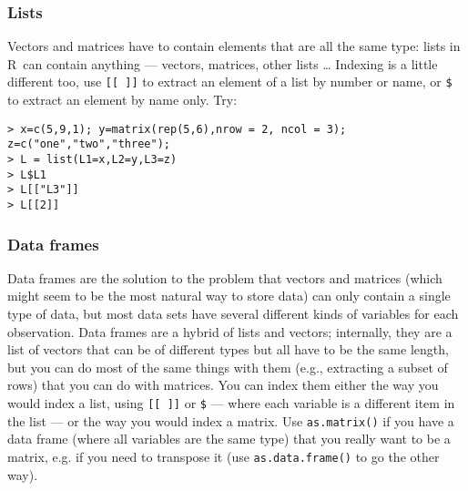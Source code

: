\documentclass [11pt]{article}
\newcommand{\code}[1]{{\tt #1}}
\newcommand\R{{\sf R}}
\numberwithin{exercise}{section}
\begin{document}
\subsubsection{Lists}
Vectors and matrices have to contain elements that are all the same type:
lists in \R\ can contain anything --- vectors, matrices, other lists \ldots
Indexing is a little different too, use \code{[[ ]]} to extract an element of a list by number or name, or
\verb+$+ to extract an element by name only. Try:
\vspace{-0.1in}
\begin{verbatim}
> x=c(5,9,1); y=matrix(rep(5,6),nrow = 2, ncol = 3); z=c("one","two","three"); 
> L = list(L1=x,L2=y,L3=z)
> L$L1
> L[["L3"]]
> L[[2]]
\end{verbatim}
\vspace{-0.1in}

\subsubsection{Data frames}
Data frames are the solution to the problem that vectors
and matrices (which might seem to be the most natural
way to store data) can only contain a single type of
data, but most data sets have several different kinds of
variables for each observation.  Data frames are a
hybrid of lists and vectors; internally, they are a list
of vectors that can be of different types but all have
to be the same length, but you can do most of the same
things with them (e.g., extracting a subset of rows)
that you can do with matrices.  You can index them
either the way you would index a list, using
\verb+[[ ]]+ or \verb+$+ --- where each variable
is a different item in the list --- or the way you
would index a matrix.  Use \code{as.matrix()}
if you have a data frame (where all variables are the same type) that
you really want to be a matrix, e.g. if you need
to transpose it (use \code{as.data.frame()} to
go the other way).



\end{document}

